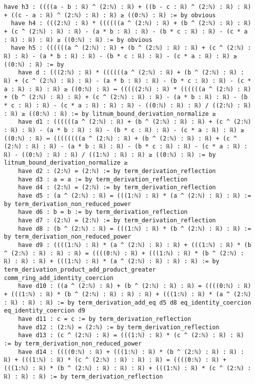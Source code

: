 \documentclass{article}
\begin{document}
\begin{tcolorbox}[colback=white!10, width=\linewidth]
\begin{lstlisting}[language=Lean4]
  have h3 : ((((a - b : ℝ) ^ (2:ℕ) : ℝ) + ((b - c : ℝ) ^ (2:ℕ) : ℝ) : ℝ) + ((c - a : ℝ) ^ (2:ℕ) : ℝ) : ℝ) ≥ ((0:ℕ) : ℝ) := by obvious
  have h4 : (((2:ℕ) : ℝ) * ((((((a ^ (2:ℕ) : ℝ) + (b ^ (2:ℕ) : ℝ) : ℝ) + (c ^ (2:ℕ) : ℝ) : ℝ) - (a * b : ℝ) : ℝ) - (b * c : ℝ) : ℝ) - (c * a : ℝ) : ℝ) : ℝ) ≥ ((0:ℕ) : ℝ) := by obvious
  have h5 : ((((((a ^ (2:ℕ) : ℝ) + (b ^ (2:ℕ) : ℝ) : ℝ) + (c ^ (2:ℕ) : ℝ) : ℝ) - (a * b : ℝ) : ℝ) - (b * c : ℝ) : ℝ) - (c * a : ℝ) : ℝ) ≥ ((0:ℕ) : ℝ) := by
    have d : (((2:ℕ) : ℝ) * ((((((a ^ (2:ℕ) : ℝ) + (b ^ (2:ℕ) : ℝ) : ℝ) + (c ^ (2:ℕ) : ℝ) : ℝ) - (a * b : ℝ) : ℝ) - (b * c : ℝ) : ℝ) - (c * a : ℝ) : ℝ) : ℝ) ≥ ((0:ℕ) : ℝ) ↔ (((((2:ℕ) : ℝ) * ((((((a ^ (2:ℕ) : ℝ) + (b ^ (2:ℕ) : ℝ) : ℝ) + (c ^ (2:ℕ) : ℝ) : ℝ) - (a * b : ℝ) : ℝ) - (b * c : ℝ) : ℝ) - (c * a : ℝ) : ℝ) : ℝ) - ((0:ℕ) : ℝ) : ℝ) / ((2:ℕ) : ℝ) : ℝ) ≥ ((0:ℕ) : ℝ) := by litnum_bound_derivation_normalize ≥
    have d1 : ((((((a ^ (2:ℕ) : ℝ) + (b ^ (2:ℕ) : ℝ) : ℝ) + (c ^ (2:ℕ) : ℝ) : ℝ) - (a * b : ℝ) : ℝ) - (b * c : ℝ) : ℝ) - (c * a : ℝ) : ℝ) ≥ ((0:ℕ) : ℝ) ↔ ((((((((a ^ (2:ℕ) : ℝ) + (b ^ (2:ℕ) : ℝ) : ℝ) + (c ^ (2:ℕ) : ℝ) : ℝ) - (a * b : ℝ) : ℝ) - (b * c : ℝ) : ℝ) - (c * a : ℝ) : ℝ) - ((0:ℕ) : ℝ) : ℝ) / ((1:ℕ) : ℝ) : ℝ) ≥ ((0:ℕ) : ℝ) := by litnum_bound_derivation_normalize ≥
    have d2 : (2:ℕ) = (2:ℕ) := by term_derivation_reflection
    have d3 : a = a := by term_derivation_reflection
    have d4 : (2:ℕ) = (2:ℕ) := by term_derivation_reflection
    have d5 : (a ^ (2:ℕ) : ℝ) = (((1:ℕ) : ℝ) * (a ^ (2:ℕ) : ℝ) : ℝ) := by term_derivation_non_reduced_power
    have d6 : b = b := by term_derivation_reflection
    have d7 : (2:ℕ) = (2:ℕ) := by term_derivation_reflection
    have d8 : (b ^ (2:ℕ) : ℝ) = (((1:ℕ) : ℝ) * (b ^ (2:ℕ) : ℝ) : ℝ) := by term_derivation_non_reduced_power
    have d9 : ((((1:ℕ) : ℝ) * (a ^ (2:ℕ) : ℝ) : ℝ) + (((1:ℕ) : ℝ) * (b ^ (2:ℕ) : ℝ) : ℝ) : ℝ) = ((((0:ℕ) : ℝ) + (((1:ℕ) : ℝ) * (b ^ (2:ℕ) : ℝ) : ℝ) : ℝ) + (((1:ℕ) : ℝ) * (a ^ (2:ℕ) : ℝ) : ℝ) : ℝ) := by term_derivation_product_add_product_greater comm_ring_add_identity_coercion
    have d10 : ((a ^ (2:ℕ) : ℝ) + (b ^ (2:ℕ) : ℝ) : ℝ) = ((((0:ℕ) : ℝ) + (((1:ℕ) : ℝ) * (b ^ (2:ℕ) : ℝ) : ℝ) : ℝ) + (((1:ℕ) : ℝ) * (a ^ (2:ℕ) : ℝ) : ℝ) : ℝ) := by term_derivation_add_eq d5 d8 eq_identity_coercion eq_identity_coercion d9
    have d11 : c = c := by term_derivation_reflection
    have d12 : (2:ℕ) = (2:ℕ) := by term_derivation_reflection
    have d13 : (c ^ (2:ℕ) : ℝ) = (((1:ℕ) : ℝ) * (c ^ (2:ℕ) : ℝ) : ℝ) := by term_derivation_non_reduced_power
    have d14 : ((((0:ℕ) : ℝ) + (((1:ℕ) : ℝ) * (b ^ (2:ℕ) : ℝ) : ℝ) : ℝ) + (((1:ℕ) : ℝ) * (c ^ (2:ℕ) : ℝ) : ℝ) : ℝ) = ((((0:ℕ) : ℝ) + (((1:ℕ) : ℝ) * (b ^ (2:ℕ) : ℝ) : ℝ) : ℝ) + (((1:ℕ) : ℝ) * (c ^ (2:ℕ) : ℝ) : ℝ) : ℝ) := by term_derivation_reflection

\end{lstlisting}
\end{tcolorbox}
\end{document}
